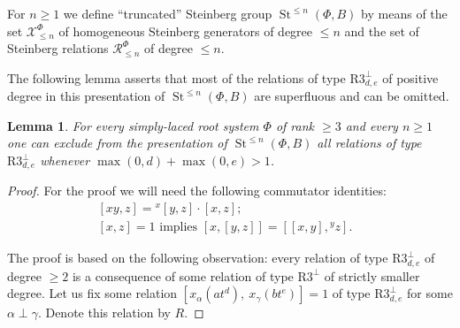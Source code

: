 \documentclass[oneside, 8pt]{amsart}
\newtheorem{lemma}{Lemma}
\theoremstyle{remark}
\theoremstyle{definition}
\numberwithin{lemma}{section}
\numberwithin{prop}{section}
\numberwithin{corollary}{section}
\DeclareMathOperator{\St}{St}
\numberwithin{equation}{section}
\begin{document}
For $n\geq 1$ we define ``truncated'' Steinberg group $\St^{\leq n}(\Phi, B)$ by means of the set $\mathcal{X}_{\leq n}^\Phi$ of homogeneous Steinberg generators of degree $\leq n$ and the set of Steinberg relations $\mathcal{R}_{\leq n}^\Phi$ of degree $\leq n$.

The following lemma asserts that most of the relations of type $\text{R3}^\bot_{d,e}$ of positive degree in this presentation of $\St^{\leq n}(\Phi, B)$ 
 are superfluous and can be omitted.
\begin{lemma}\label{superfluous-relations}
 For every simply-laced root system $\Phi$ of rank $\geq 3$ and every $n \geq 1$ one can exclude from
 the presentation of $\St^{\leq n}(\Phi, B)$ all relations of type $\text{R3}_{d,e}^\bot$ whenever $\max(0,d) + \max(0,e) > 1$.
\end{lemma}
\begin{proof}
For the proof we will need the following commutator identities:
\begin{align} \label{eq:H1ii} [xy, z] = {}^x[y, z] \cdot [x,z];&\\ %
 \label{eq:H1iii} [x,z] = 1 \text{ implies } [x, [y,z]] = [[x,y],{}^yz].& \end{align}
 
The proof is based on the following observation: every relation of type $\text{R3}^\bot_{d,e}$ of degree
 $\geq 2$ is a consequence of some relation of type $\text{R3}^\bot$ of strictly smaller degree.
Let us fix some relation $[x_\alpha(at^d),\ x_\gamma(bt^e)] = 1$ of type $\text{R3}^\bot_{d,e}$ for some $\alpha\perp\gamma$. Denote this relation by $R$.


\end{proof}
\end{document}
